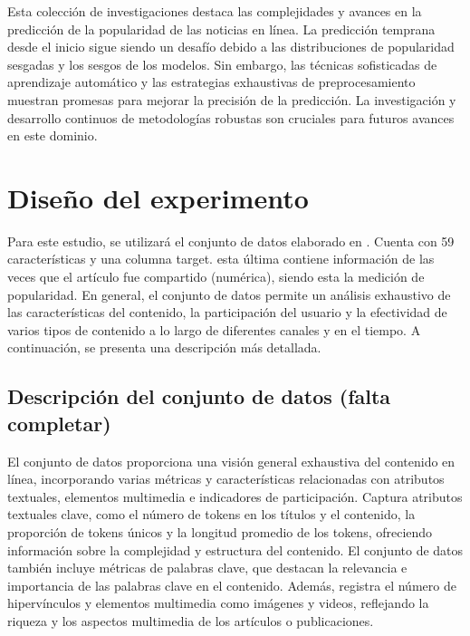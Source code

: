 \documentclass[
  number,
  preprint,
  3p,
  twocolumn]{elsarticle}
\begin{document}
Esta colección de investigaciones destaca las complejidades y avances en
la predicción de la popularidad de las noticias en línea. La predicción
temprana desde el inicio sigue siendo un desafío debido a las
distribuciones de popularidad sesgadas y los sesgos de los modelos. Sin
embargo, las técnicas sofisticadas de aprendizaje automático y las
estrategias exhaustivas de preprocesamiento muestran promesas para
mejorar la precisión de la predicción. La investigación y desarrollo
continuos de metodologías robustas son cruciales para futuros avances en
este dominio.

\section{Diseño del experimento}\label{diseuxf1o-del-experimento}

Para este estudio, se utilizará el conjunto de datos elaborado en
\citep{fernandes2015}. Cuenta con 59 características y una columna
target. esta última contiene información de las veces que el artículo
fue compartido (numérica), siendo esta la medición de popularidad. En
general, el conjunto de datos permite un análisis exhaustivo de las
características del contenido, la participación del usuario y la
efectividad de varios tipos de contenido a lo largo de diferentes
canales y en el tiempo. A continuación, se presenta una descripción más
detallada.

\subsection{Descripción del conjunto de datos (falta
completar)}\label{descripciuxf3n-del-conjunto-de-datos-falta-completar}

El conjunto de datos proporciona una visión general exhaustiva del
contenido en línea, incorporando varias métricas y características
relacionadas con atributos textuales, elementos multimedia e indicadores
de participación. Captura atributos textuales clave, como el número de
tokens en los títulos y el contenido, la proporción de tokens únicos y
la longitud promedio de los tokens, ofreciendo información sobre la
complejidad y estructura del contenido. El conjunto de datos también
incluye métricas de palabras clave, que destacan la relevancia e
importancia de las palabras clave en el contenido. Además, registra el
número de hipervínculos y elementos multimedia como imágenes y videos,
reflejando la riqueza y los aspectos multimedia de los artículos o
publicaciones.
\end{document}
